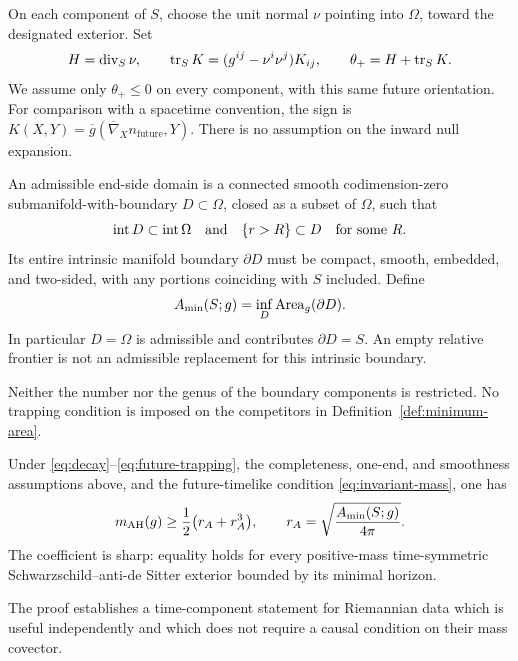 On each component of $S$, choose the unit normal $\nu$ pointing into
$\Omega$, toward the designated exterior. Set
\begin{equation}\label{eq:future-trapping}
 H=\operatorname{div}_S\nu,
 \qquad \operatorname{tr}_SK=(g^{ij}-\nu^i\nu^j)K_{ij},
 \qquad \theta_+=H+\operatorname{tr}_SK.
\end{equation}
We assume only $\theta_+\le0$ on every component, with this same future
orientation. For comparison with a spacetime convention, the sign is
$K(X,Y)=\overline g(\overline\nabla_Xn_{\mathrm{future}},Y)$.
There is no assumption on the inward null expansion.

\begin{definition}\label{def:minimum-area}
An admissible end-side domain is a connected smooth codimension-zero
submanifold-with-boundary $D\subset\Omega$, closed as a subset of
$\Omega$, such that
\[
 \operatorname{int}D\subset\operatorname{int}\Omega
 \quad\hbox{and}\quad
 \{r>R\}\subset D\quad\hbox{for some }R.
\]
Its entire intrinsic manifold boundary $\partial D$ must be compact,
smooth, embedded, and two-sided, with any portions coinciding with $S$
included. Define
\begin{equation}\label{eq:minimum-area}
 A_{\min}(S;g)=\inf_D\operatorname{Area}_g(\partial D).
\end{equation}
In particular $D=\Omega$ is admissible and contributes $\partial D=S$.
An empty relative frontier is not an admissible replacement for this
intrinsic boundary.
\end{definition}

Neither the number nor the genus of the boundary components is
restricted. No trapping condition is imposed on the competitors in
Definition~\ref{def:minimum-area}.

\begin{theorem}\label{thm:main}
Under \eqref{eq:decay}--\eqref{eq:future-trapping}, the completeness,
one-end, and smoothness assumptions above, and the future-timelike
condition \eqref{eq:invariant-mass}, one has
\begin{equation}\label{eq:main-inequality}
 m_{\mathrm{AH}}(g)\ge\frac12\bigl(r_A+r_A^3\bigr),
 \qquad r_A=\sqrt{\frac{A_{\min}(S;g)}{4\pi}}.
\end{equation}
The coefficient is sharp: equality holds for every positive-mass
time-symmetric Schwarzschild--anti-de Sitter exterior bounded by its
minimal horizon.
\end{theorem}

The proof establishes a time-component statement for Riemannian data
which is useful independently and which does not require a causal
condition on their mass covector.

